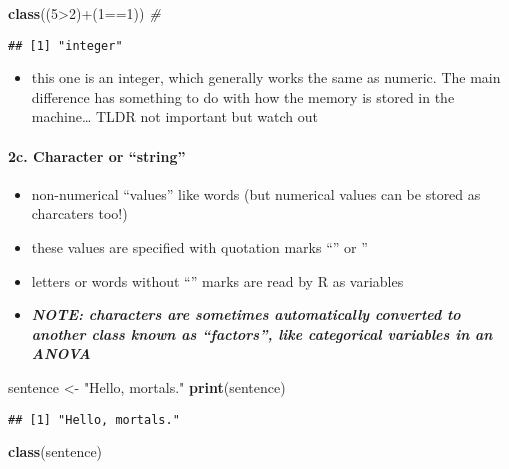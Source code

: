 \documentclass[]{article}
\newenvironment{Shaded}{\begin{snugshade}}{\end{snugshade}}
\newcommand{\KeywordTok}[1]{\textcolor[rgb]{0.13,0.29,0.53}{\textbf{{#1}}}}
\newcommand{\DecValTok}[1]{\textcolor[rgb]{0.00,0.00,0.81}{{#1}}}
\newcommand{\StringTok}[1]{\textcolor[rgb]{0.31,0.60,0.02}{{#1}}}
\newcommand{\CommentTok}[1]{\textcolor[rgb]{0.56,0.35,0.01}{\textit{{#1}}}}
\newcommand{\NormalTok}[1]{{#1}}
\providecommand{\tightlist}{%
  \setlength{\itemsep}{0pt}\setlength{\parskip}{0pt}}
\let\oldparagraph\paragraph
\renewcommand{\paragraph}[1]{\oldparagraph{#1}\mbox{}}
\begin{document}
\begin{Shaded}
\begin{Highlighting}[]
\KeywordTok{class}\NormalTok{((}\DecValTok{5}\NormalTok{>}\DecValTok{2}\NormalTok{)+(}\DecValTok{1}\NormalTok{==}\DecValTok{1}\NormalTok{)) }\CommentTok{#}
\end{Highlighting}
\end{Shaded}

\begin{verbatim}
## [1] "integer"
\end{verbatim}

\begin{itemize}
\tightlist
\item
  this one is an integer, which generally works the same as numeric. The
  main difference has something to do with how the memory is stored in
  the machine\ldots{} TLDR not important but watch out
\end{itemize}

\paragraph{\texorpdfstring{2c. Character or
``string''}{2c. Character or string}}\label{c.-character-or-string}

\begin{itemize}
\tightlist
\item
  non-numerical ``values'' like words (but numerical values can be
  stored as charcaters too!)
\item
  these values are specified with quotation marks ``'' or ''
\item
  letters or words without ``'' marks are read by R as variables
\item
  \textbf{\emph{NOTE: characters are sometimes automatically converted
  to another class known as ``factors'', like categorical variables in
  an ANOVA }}
\end{itemize}

\begin{Shaded}
\begin{Highlighting}[]
\NormalTok{sentence <-}\StringTok{ "Hello, mortals."}
\KeywordTok{print}\NormalTok{(sentence)}
\end{Highlighting}
\end{Shaded}

\begin{verbatim}
## [1] "Hello, mortals."
\end{verbatim}

\begin{Shaded}
\begin{Highlighting}[]
\KeywordTok{class}\NormalTok{(sentence)}
\end{Highlighting}
\end{Shaded}
\end{document}
